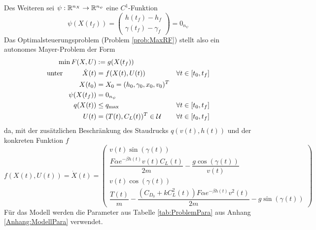 Des Weiteren sei $\psi : \mathbb{R}^{n_X} \to \mathbb{R}^{n_{\psi}}$ eine $C^1$-Funktion
\[\psi(X(t_f)) = 
\begin{pmatrix}
    h(t_f) - h_f \\ 
    \gamma(t_f) - \gamma_f
\end{pmatrix} = 0_{n_{\psi}}\]
Das Optimalsteuerungsproblem (Problem \ref{prob:MaxRF}) stellt also ein autonomes Mayer-Problem der Form 
\begin{equation} \label{equ:mayer_problem}
    \begin{aligned}
        \min F(X,U) &:= g(X(t_f)) & & \\
        \text{unter}  \hspace{10mm} \dot{X}(t) &= f(X(t),U(t)) & & \forall t \in [t_0,t_f] \\
        X(t_0) &= X_0 = (h_0,\gamma_0,x_0,v_0)^T & & \\
        \psi(X(t_f)) &= 0_{n_{\psi}} & & \\
        q(X(t)) &\leq q_{\max} & & \forall t \in [t_0,t_f] \\
        U(t) &= (T(t),C_L(t))^T \in \mathcal{U}  & & \forall t \in [t_0,t_f] 
    \end{aligned}
\end{equation}
da, mit der zusätzlichen Beschränkung des Staudrucks $q(v(t),h(t))$ und der konkreten Funktion $f$
\begin{equation} \label{equ:state_space}
    f(X(t),U(t)) = \dot{X}(t) = \begin{pmatrix}
        v(t) \sin(\gamma(t)) \\ 
        \dfrac{F \alpha e^{-\beta h(t)} v(t) C_L(t)}{2m} - \dfrac{g \cos(\gamma(t))}{v(t)} \\ 
        v(t) \cos(\gamma(t)) \\ 
        \dfrac{T(t)}{m} - \dfrac{(C_{D_0} + k C_L^2(t)) F \alpha e^{-\beta h(t)} v^2(t)}{2m} - g \sin(\gamma(t))
    \end{pmatrix}
\end{equation}
Für das Modell werden die Parameter aus Tabelle \ref{tab:ProblemPara} aus Anhang \ref{Anhang:ModellPara} verwendet.






